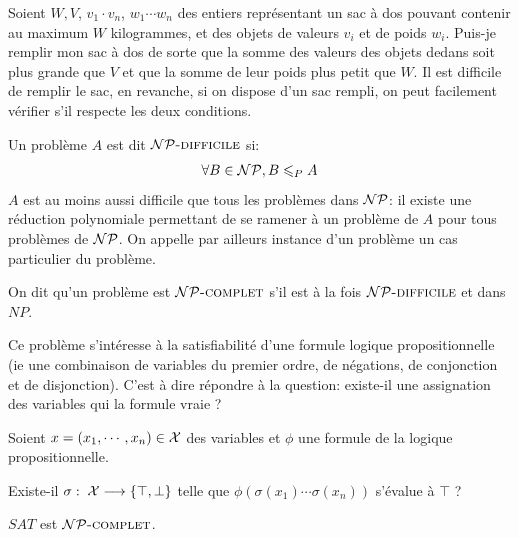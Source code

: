 \documentclass{standalone}
\begin{document}
\begin{exemple}
	Soient $W, V$, $v_1 \cdot v_n$, $w_1 \cdots w_n$ des entiers représentant un sac à dos pouvant contenir au maximum $W$ kilogrammes, et des objets de valeurs $v_i$ et de poids $w_i$. Puis-je remplir mon sac à dos de sorte que la somme des valeurs des objets dedans soit plus grande que $V$ et que la somme de leur poids plus petit que $W$. Il est difficile de remplir le sac, en revanche, si on dispose d'un sac rempli, on peut facilement vérifier s'il respecte les deux conditions.
\end{exemple}

\begin{defn}
	Un problème $A$ est dit $\mathcal{NP}\text{\textsc{-difficile}}$ si:
	\[\forall B \in \mathcal{NP}, B \leqslant_P A\]
	 $A$ est au moins aussi difficile que tous les problèmes dans $\mathcal{NP}$: il existe une réduction polynomiale permettant de se ramener à un problème de $A$ pour tous problèmes de $\mathcal{NP}$.	On appelle par ailleurs instance d'un problème un cas particulier du problème.
\end{defn}

\begin{defn}[$\NPCOMPLETE$]
	On dit qu'un problème est $\NPCOMPLETE$ s'il est à la fois $\mathcal{NP}\text{\textsc{-difficile}}$ et dans $NP$.
\end{defn}

\begin{defn}
	Ce problème s'intéresse à la satisfiabilité d'une formule logique propositionnelle (ie une combinaison de variables du premier ordre, de négations, de conjonction et de disjonction). C'est à dire répondre à la question: existe-il une assignation des variables qui la formule vraie ?
	
	Soient $x = (x_1, \cdots, x_n) \in \mathcal X$ des variables et $\phi$ une formule de la logique propositionnelle.
	
	Existe-il $\sigma:\; \mathcal X \longrightarrow \left\{ \top, \bot\right\}$ telle que $\phi(\sigma(x_1) \cdots \sigma(x_n))$ s'évalue à $\top$ ?
\end{defn}

\begin{thm}
	$SAT$ est $\NPCOMPLETE$.
\end{thm}
\end{document}
